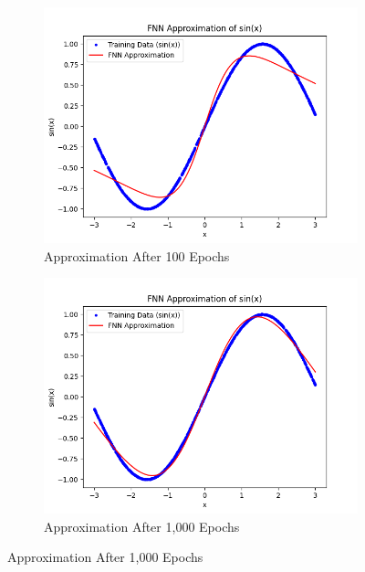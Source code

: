 \documentclass{article}
\begin{document}
\begin{figure}[h!]
    \centering
    \begin{subfigure}{0.45\textwidth}
        \centering
        \includegraphics[width=\linewidth]{figs/FNN_Test01.png}
        \caption*{Approximation After 100 Epochs}
        \label{fig:100epochs}
    \end{subfigure}
    \hfill
    \begin{subfigure}{0.45\textwidth}
        \centering
        \includegraphics[width=\linewidth]{figs/FNN_Test02.png}
        \caption*{Approximation After 1,000 Epochs}
        \label{fig:1000epochs}
    \end{subfigure}


\end{figure}
\end{document}
